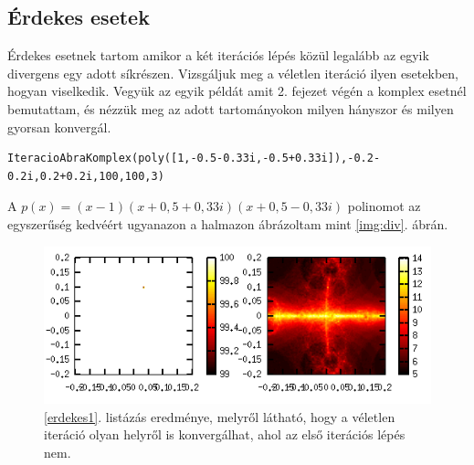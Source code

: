 \documentclass[a4paper,12pt]{report}
\begin{document}
			\subsection{Érdekes esetek}
				Érdekes esetnek tartom amikor a két iterációs lépés közül legalább az egyik divergens egy adott síkrészen. Vizsgáljuk meg a véletlen iteráció ilyen esetekben, hogyan viselkedik. Vegyük az egyik példát amit 2. fejezet végén a komplex esetnél bemutattam, és nézzük meg az adott tartományokon milyen hányszor és milyen gyorsan konvergál.
               	\begin{singlespace}
                \begin{lstlisting}[caption=Bemenet,label=erdekes1]
IteracioAbraKomplex(poly([1,-0.5-0.33i,-0.5+0.33i]),-0.2-0.2i,0.2+0.2i,100,100,3)
                \end{lstlisting}
                \end{singlespace}
                A $p(x) = (x-1)(x+0,\!5+0,\!33i)(x+0,\!5-0,\!33i)$ polinomot az egyszerűség kedvéért ugyanazon a halmazon ábrázoltam mint \ref{img:div}. ábrán.

               			 \begin{figure}[h!]
					\centering
					\includegraphics[scale=0.7]{kepek/erdekes.png}
					\caption{\ref{erdekes1}. listázás eredménye, melyről látható, hogy a véletlen iteráció olyan helyről is konvergálhat, ahol az első iterációs lépés nem.}
				\end{figure}
\end{document}

